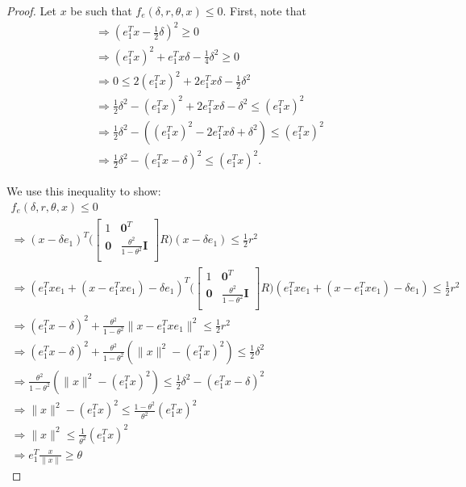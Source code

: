 \begin{proof}
Let $x$ be such that $f_e(\delta, r, \theta, x) \le 0$.
First, note that
\begin{align*}
\Longrightarrow (e_1^Tx - \frac 1 2 \delta )^2\ge 0\\
\Longrightarrow (e_1^Tx)^2 + e_1^Tx\delta  - \frac 1 4 \delta^2 \ge 0\\
\Longrightarrow 0 \le 2(e_1^Tx)^2 + 2e_1^Tx\delta  - \frac 1 2 \delta^2\\
\Longrightarrow \frac 1 2 \delta^2 - (e_1^Tx)^2 + 2e_1^Tx\delta - \delta^2 \le (e_1^Tx)^2 \\
\Longrightarrow \frac 1 2 \delta^2 - \left((e_1^Tx)^2 - 2e_1^Tx\delta + \delta^2\right) \le (e_1^Tx)^2 \\
\Longrightarrow \frac 1 2 \delta^2 - (e_1^Tx - \delta)^2 \le (e_1^Tx)^2.
\end{align*}

We use this inequality to show:
\begin{align*}
f_e(\delta, r, \theta, x) \le 0 \\
\Longrightarrow (x - \delta e_1)^T\bigg(\begin{bmatrix}
1 & \boldsymbol0^T \\
\boldsymbol 0 & \frac{\theta^2}{1 - \theta^2} \boldsymbol I \\
\end{bmatrix}R\bigg)(x - \delta e_1) \le \frac 1 2 r^2 \\
\Longrightarrow (e_1^Txe_1 + (x - e_1^Txe_1) - \delta e_1)^T\bigg(\begin{bmatrix}
1 & \boldsymbol0^T \\
\boldsymbol 0 & \frac{\theta^2}{1 - \theta^2} \boldsymbol I \\
\end{bmatrix}R\bigg)(e_1^Txe_1 + (x - e_1^Txe_1) - \delta e_1) \le \frac 1 2 r^2 \\
\Longrightarrow
(e_1^Tx - \delta)^2 + \frac{\theta^2}{1 - \theta^2}\|x - e_1^Tx e_1\|^2 \le \frac 1 2 r^2 \\
\Longrightarrow
(e_1^Tx - \delta)^2 + \frac{\theta^2}{1 - \theta^2}(\|x\|^2 - (e_1^Tx)^2) \le \frac 1 2 \delta^2 \\
\Longrightarrow\frac{\theta^2}{1 - \theta^2}(\|x\|^2 - (e_1^Tx)^2) \le \frac 1 2 \delta^2 - (e_1^Tx - \delta)^2\\
\Longrightarrow\|x\|^2 - (e_1^Tx)^2 \le \frac{1 - \theta^2}{\theta^2}(e_1^Tx)^2 \\
\Longrightarrow\|x\|^2 \le \frac 1 {\theta^2}(e_1^Tx)^2 \\
\Longrightarrow e_1^T\frac{x}{\|x\|} \ge \theta
\end{align*}
\end{proof}


